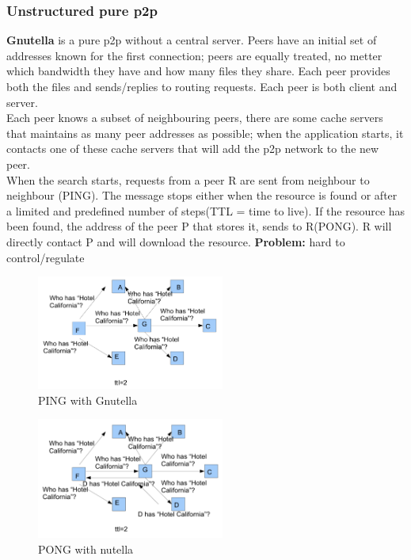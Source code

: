 \documentclass[paper=a4, fontsize=11pt]{scrartcl} %
\numberwithin{equation}{section} %
\numberwithin{figure}{section} %
\numberwithin{table}{section} %
\begin{document}
\subsubsection*{Unstructured pure p2p}
\textbf{Gnutella} is a pure p2p without a central server. Peers have an initial set of addresses known for the first connection; peers are equally treated, no metter which bandwidth they have and how many files they share. Each peer provides both the files and sends/replies to routing requests. Each peer is both client and server.\\
Each peer knows a subset of neighbouring peers, there are some cache servers that maintains as many peer addresses as possible; when the application starts, it contacts one of these cache servers that will add the p2p network to the new peer.\\
When the search starts, requests from a peer R are sent from neighbour to neighbour (PING). The message stops either when the resource is found or after a limited and predefined number of steps(TTL = time to live). If the resource has been found, the address of the peer P that stores it, sends to R(PONG). R will directly contact P and will download the resource.
\textbf{Problem:} hard to control/regulate 
 \begin{figure}[H]
  \centering
  \includegraphics[width=0.55\textwidth]{img/gnu1.png}
  \caption{PING with Gnutella}
  \label{fig:boat1}
\end{figure}
 \begin{figure}[H]
  \centering
  \includegraphics[width=0.55\textwidth]{img/gnu2.png}
  \caption{PONG with nutella}
  \label{fig:boat1}
\end{figure}
\end{document}
